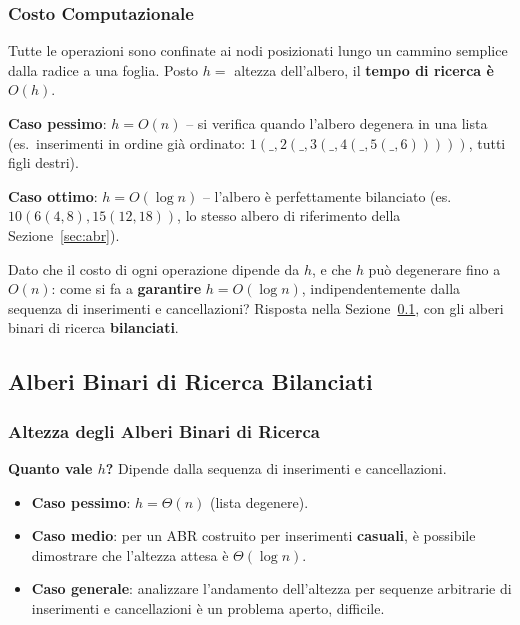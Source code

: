 \documentclass[12pt, a4paper]{article}
\begin{document}
\subsubsection{Costo Computazionale}

\begin{tcolorbox}[colback=lightergray!10, colframe=tocsec, title=\textbf{Osservazione}]
\label{oss:costo-abr}
Tutte le operazioni sono confinate ai nodi posizionati lungo un cammino semplice dalla radice a una foglia. Posto $h=$ altezza dell'albero, il \textbf{tempo di ricerca è $O(h)$}.
\end{tcolorbox}

\textbf{Caso pessimo}: $h=O(n)$ -- si verifica quando l'albero degenera in una lista (es.\ inserimenti in ordine già ordinato: $1(\_,2(\_,3(\_,4(\_,5(\_,6)))))$, tutti figli destri).

\textbf{Caso ottimo}: $h=O(\log n)$ -- l'albero è perfettamente bilanciato (es.\ $10(6(4,8),15(12,18))$, lo stesso albero di riferimento della Sezione~\ref{sec:abr}).

\begin{tcolorbox}[colback=lightergray!5, colframe=tocsubsec, title=\textbf{Domanda Aperta (verso la prossima sezione)}]
Dato che il costo di ogni operazione dipende da $h$, e che $h$ può degenerare fino a $O(n)$: come si fa a \textbf{garantire} $h=O(\log n)$, indipendentemente dalla sequenza di inserimenti e cancellazioni? Risposta nella Sezione~\ref{sec:abr-bilanciati}, con gli alberi binari di ricerca \textbf{bilanciati}.
\end{tcolorbox}

\subsection{Alberi Binari di Ricerca Bilanciati}
\label{sec:abr-bilanciati}

\subsubsection{Altezza degli Alberi Binari di Ricerca}

\textbf{Quanto vale $h$?} Dipende dalla sequenza di inserimenti e cancellazioni.
\begin{itemize}
    \item \textbf{Caso pessimo}: $h=\Theta(n)$ (lista degenere).
    \item \textbf{Caso medio}: per un ABR costruito per inserimenti \textbf{casuali}, è possibile dimostrare che l'altezza attesa è $\Theta(\log n)$.
    \item \textbf{Caso generale}: analizzare l'andamento dell'altezza per sequenze arbitrarie di inserimenti e cancellazioni è un problema aperto, difficile.
\end{itemize}
\end{document}
